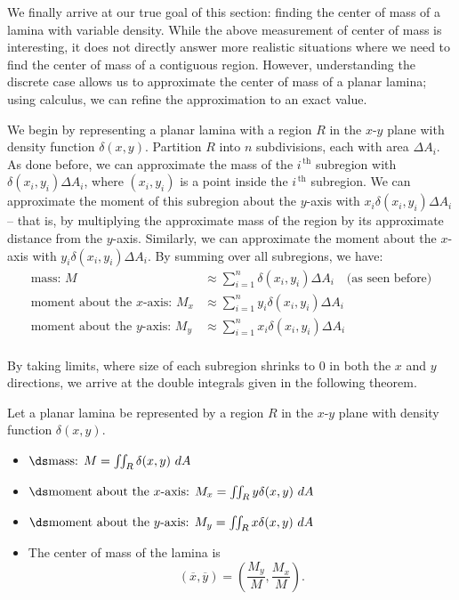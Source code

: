 We finally arrive at our true goal of this section: finding the center of mass of a lamina with variable density. While the above measurement of center of mass is interesting, it does not directly answer more realistic situations where we need to find the center of mass of a contiguous region. However, understanding the discrete case allows us to approximate the center of mass of a planar lamina; using calculus, we can refine the approximation to an exact value.

We begin by representing a planar lamina with a region $R$ in the $x$-$y$ plane with density function $\delta(x,y)$. Partition $R$ into $n$ subdivisions, each with area $\Delta A_i$. As done before, we can approximate the mass of the $i^{\,\text{th}}$ subregion with $\delta(x_i,y_i)\Delta A_i$, where $(x_i,y_i)$ is a point inside the $i^{\,\text{th}}$ subregion. We can approximate the moment of this subregion about the $y$-axis with $x_i\delta(x_i,y_i)\Delta A_i$ -- that is, by multiplying the approximate mass of the region by its approximate distance from the $y$-axis. Similarly, we can approximate the moment about the $x$-axis with $y_i\delta(x_i,y_i)\Delta A_i$. By summing over all subregions, we have:
\begin{align*}
\text{mass: } M &\approx \sum_{i=1}^n \delta(x_i,y_i)\Delta A_i\quad \text{(as seen before)}\\
\text{moment about the $x$-axis: } M_x &\approx \sum_{i=1}^n y_i\delta(x_i,y_i)\Delta A_i\\
\text{moment about the $y$-axis: } M_y &\approx \sum_{i=1}^n x_i\delta(x_i,y_i)\Delta A_i\\
\end{align*}

By taking limits, where size of each subregion shrinks to 0 in both the $x$ and $y$ directions, we arrive at the double integrals given in the following theorem.

{Let a planar lamina be represented by a region $R$ in the $x$-$y$ plane with density function $\delta(x,y)$. 
\begin{itemize}
	\item $\ds \text{mass: } M = \iint_R\delta(x,y)\ dA$
	\item	$\ds \text{moment about the $x$-axis: } M_x = \iint_Ry\delta(x,y)\ dA$
	\item	$\ds \text{moment about the $y$-axis: } M_y = \iint_Rx\delta(x,y)\ dA$
	\item The center of mass  of the lamina is
	$$(\overline{x},\overline{y}) = \left(\frac{M_y}{M},\frac{M_x}M\right).$$
\end{itemize}
}

